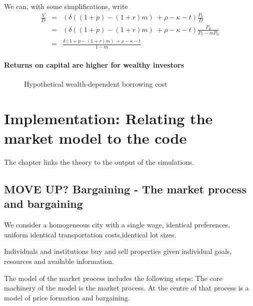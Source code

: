 We can, with some simplifications, write
\begin{eqnarray}
\frac{V}{D}&=&( \delta((1+\dot p)  - (1+r)m) \ + \rho   	-\kappa - t ) \frac{P_0}{D}   \nonumber\\
		&=&( \delta((1+\dot p)  - (1+r)m) \ + \rho   	-\kappa - t ) \frac{P_0}{P_0-mP_0}   \nonumber\\
		&=&\frac{ \delta(1+\dot p  - (1+r)m) \ + \rho   	-\kappa - t } {1-m} \label{Eqn:DecisionRule}
\end{eqnarray}

\subsubsection{Returns on capital are higher for wealthy investors}
\begin{figure}[htb]
\begin{center}

\caption{Hypothetical wealth-dependent borrowing cost}
\label{Fig:BorrowingCost}
\end{center}
\end{figure}%



\chapter{Implementation: Relating the market model to the code}
The chapter links the theory to the output of the simulations. %


\section{MOVE UP? Bargaining - The market process and bargaining}
We consider a homogeneous city with a single wage, identical preferences, uniform identical transportation costs,identical lot sizes.

Individuals and institutions buy and sell properties given individual goals, resources and available information.

The model of the market process includes the following steps:
The core machinery of the model is the market process. At the centre of that process is a model of price formation and bargaining. %

